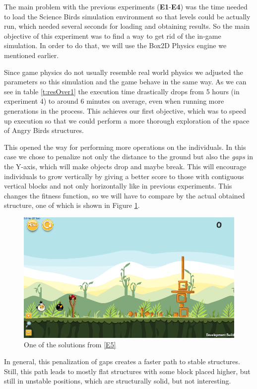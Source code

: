 \documentclass[a4paper,twoside]{article}
\begin{document}
The main problem with the previous experiments
(\textbf{E1}-\textbf{E4}) was the time needed to load the Science
Birds simulation environment so that levels could be actually run, which needed several
seconds for loading and obtaining results. So the main objective of
this experiment was to find a way to get rid of the in-game
simulation. In order to do that, we will use the Box2D
\cite{catto2011box2d} Physics engine we mentioned earlier.

Since game physics do not usually resemble real world physics we adjusted
the parameters so this simulation and the game behave in the same way.
As we can see in table \ref{t:resOver1} the execution time drastically
drops from 5 hours (in experiment 4) to around 6 minutes on average, even when running
more generations in the process. This achieves our first objective,
which was to speed up execution so that we could perform a more
thorough exploration of the space of Angry Birds structures.


This opened the way for performing more 
operations on the individuals. In this case we chose to penalize
not only the distance to the ground but also the \textit{gaps} in the
Y-axis, which will make objects drop and maybe break.
This will encourage individuals to grow vertically by giving a better
score to those with contiguous vertical blocks and not only horizontally
like in previous experiments. This changes the fitness function, so we
will have to compare by the actual obtained structure, one of which is
shown in Figure \ref{f:e5}.
%
 \begin{figure}
 	\centering
 	\includegraphics[scale=0.3]{E5.png}
 	\caption{One of the solutions from \ref{E5}}\label{f:e5}
      \end{figure}

In general, this penalization of gaps creates a faster path to stable
structures. Still, this path leads to mostly flat structures with 
some block placed higher, but still in unstable positions, which
are structurally solid, but not interesting. 
\end{document}
